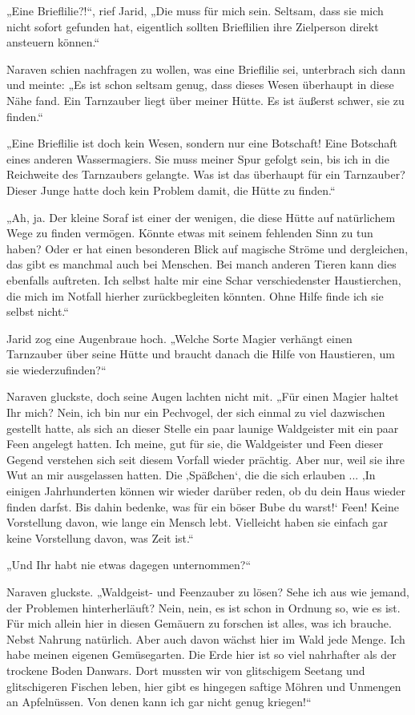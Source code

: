 „Eine Brieflilie?!“, rief Jarid, „Die muss für mich sein. Seltsam, dass sie mich nicht sofort gefunden hat, eigentlich sollten Brieflilien ihre Zielperson direkt ansteuern können.“

Naraven schien nachfragen zu wollen, was eine Brieflilie sei, unterbrach sich dann und meinte: „Es ist schon seltsam genug, dass dieses Wesen überhaupt in diese Nähe fand. Ein Tarnzauber liegt über meiner Hütte. Es ist äußerst schwer, sie zu finden.“

„Eine Brieflilie ist doch kein Wesen, sondern nur eine Botschaft! Eine Botschaft eines anderen Wassermagiers. Sie muss meiner Spur gefolgt sein, bis ich in die Reichweite des Tarnzaubers gelangte. Was ist das überhaupt für ein Tarnzauber? Dieser Junge hatte doch kein Problem damit, die Hütte zu finden.“

„Ah, ja. Der kleine Soraf ist einer der wenigen, die diese Hütte auf natürlichem Wege zu finden vermögen. Könnte etwas mit seinem fehlenden Sinn zu tun haben? Oder er hat einen besonderen Blick auf magische Ströme und dergleichen, das gibt es manchmal auch bei Menschen. Bei manch anderen Tieren kann dies ebenfalls auftreten. Ich selbst halte mir eine Schar verschiedenster Haustierchen, die mich im Notfall hierher zurückbegleiten könnten. Ohne Hilfe finde ich sie selbst nicht.“

Jarid zog eine Augenbraue hoch. „Welche Sorte Magier verhängt einen Tarnzauber über seine Hütte und braucht danach die Hilfe von Haustieren, um sie wiederzufinden?“

Naraven gluckste, doch seine Augen lachten nicht mit. „Für einen Magier haltet Ihr mich? Nein, ich bin nur ein Pechvogel, der sich einmal zu viel dazwischen gestellt hatte, als sich an dieser Stelle ein paar launige Waldgeister mit ein paar Feen angelegt hatten. Ich meine, gut für sie, die Waldgeister und Feen dieser Gegend verstehen sich seit diesem Vorfall wieder prächtig. Aber nur, weil sie ihre Wut an mir ausgelassen hatten. Die ‚Späßchen‘, die die sich erlauben ... ‚In einigen Jahrhunderten können wir wieder darüber reden, ob du dein Haus wieder finden darfst. Bis dahin bedenke, was für ein böser Bube du warst!‘ Feen! Keine Vorstellung davon, wie lange ein Mensch lebt. Vielleicht haben sie einfach gar keine Vorstellung davon, was Zeit ist.“

„Und Ihr habt nie etwas dagegen unternommen?“

Naraven gluckste. „Waldgeist- und Feenzauber zu lösen? Sehe ich aus wie jemand, der Problemen hinterherläuft? Nein, nein, es ist schon in Ordnung so, wie es ist. Für mich allein hier in diesen Gemäuern zu forschen ist alles, was ich brauche. Nebst Nahrung natürlich. Aber auch davon wächst hier im Wald jede Menge. Ich habe meinen eigenen Gemüsegarten. Die Erde hier ist so viel nahrhafter als der trockene Boden Danwars. Dort mussten wir von glitschigem Seetang und glitschigeren Fischen leben, hier gibt es hingegen saftige Möhren und Unmengen an Apfelnüssen. Von denen kann ich gar nicht genug kriegen!“

